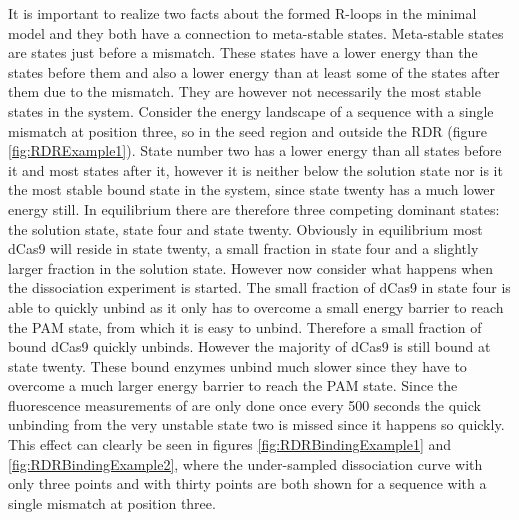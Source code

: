 It is important to realize two facts about the formed R-loops in the minimal model and they both have a connection to meta-stable states. Meta-stable states are states just before a mismatch. These states have a lower energy than the states before them and also a lower energy than at least some of the states after them due to the mismatch. They are however not necessarily the most stable states in the system. Consider the energy landscape of a sequence with a single mismatch at position three, so in the seed region and outside the RDR (figure \ref{fig:RDRExample1}). State number two has a lower energy than all states before it and most states after it, however it is neither below the solution state nor is it the most stable bound state in the system, since state twenty has a much lower energy still. In equilibrium there are therefore three competing dominant states: the solution state, state four and state twenty. Obviously in equilibrium most dCas9 will reside in state twenty, a small fraction in state four and a slightly larger fraction in the solution state. However now consider what happens when the dissociation experiment is started. The small fraction of dCas9 in state four is able to quickly unbind as it only has to overcome a small energy barrier to reach the PAM state, from which it is easy to unbind. Therefore a small fraction of bound dCas9 quickly unbinds. However the majority of dCas9 is still bound at state twenty. These bound enzymes unbind much slower since they have to overcome a much larger energy barrier to reach the PAM state. Since the fluorescence measurements of \cite{PNAS} are only done once every 500 seconds the quick unbinding from the very unstable state two is missed since it happens so quickly. This effect can clearly be seen in figures \ref{fig:RDRBindingExample1} and \ref{fig:RDRBindingExample2}, where the under-sampled dissociation curve with only three points and with thirty points are both shown for a sequence with a single mismatch at position three.


